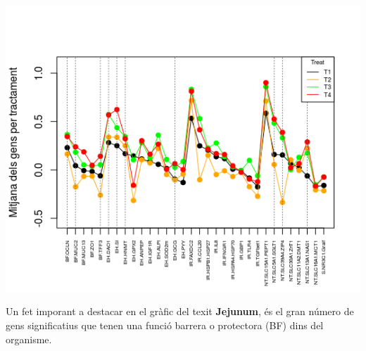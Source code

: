 \documentclass[english]{article}
\begin{document}
\begin{center}
\includegraphics[scale=0.6]{lineplotj.png}
\end{center}
Un fet imporant a destacar en el gràfic del texit \textbf{Jejunum}, és el gran número de gens significatius que tenen una funció barrera o protectora (BF) dins del organisme.\\
\end{document}

